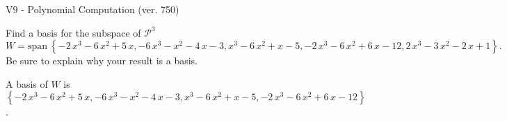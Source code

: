 \begin{exercise}
  \begin{exerciseTitle}V9 - Polynomial Computation (ver. 750)\end{exerciseTitle}
  \begin{exerciseStatement}
    Find a basis for the subspace of \(\mathcal{P}^3\) 
\[W=\mathrm{span}\ \left\{-2 \, x^{3} - 6 \, x^{2} + 5 \, x , -6 \, x^{3} - x^{2} - 4 \, x - 3 , x^{3} - 6 \, x^{2} + x - 5 , -2 \, x^{3} - 6 \, x^{2} + 6 \, x - 12 , 2 \, x^{3} - 3 \, x^{2} - 2 \, x + 1\right\}.\]
 Be sure to explain why your result is a basis.


  \end{exerciseStatement}
  \begin{exerciseAnswer}
   A basis of \(W\) is  \(\left\{-2 \, x^{3} - 6 \, x^{2} + 5 \, x , -6 \, x^{3} - x^{2} - 4 \, x - 3 , x^{3} - 6 \, x^{2} + x - 5 , -2 \, x^{3} - 6 \, x^{2} + 6 \, x - 12\right\}\).
  


  \end{exerciseAnswer}
\end{exercise}